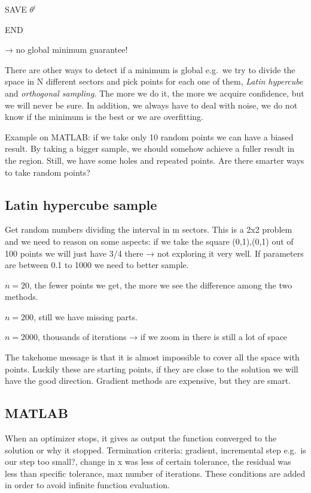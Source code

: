 SAVE $\theta^i$

END

→ no global minimum guarantee!

There are other ways to detect if a minimum is global e.g.~we try to
divide the space in N different sectors and pick points for each one of
them, \emph{Latin hypercube} and \emph{orthogonal sampling}. The more we
do it, the more we acquire confidence, but we will never be sure. In
addition, we always have to deal with noise, we do not know if the
minimum is the best or we are overfitting.

Example on MATLAB: if we take only 10 random points we can have a biased
result. By taking a bigger sample, we should somehow achieve a fuller
result in the region. Still, we have some holes and repeated points. Are
there smarter ways to take random points?

\hypertarget{latin-hypercube-sample}{%
\subsection{Latin hypercube sample}\label{latin-hypercube-sample}}

Get random numbers dividing the interval in m sectors. This is a 2x2
problem and we need to reason on some aspects: if we take the square
(0,1),(0,1) out of 100 points we will just have 3/4 there → not
exploring it very well. If parameters are between 0.1 to 1000 we need to
better sample.

$n = 20$, the fewer points we get, the more we see the difference among
the two methods.

$n = 200$, still we have missing parts.

$n = 2000$, thousands of iterations → if we zoom in there is still a lot
of space

The takehome message is that it is almost impossible to cover all the
space with points. Luckily these are starting points, if they are close
to the solution we will have the good direction. Gradient methods are
expensive, but they are smart.

\hypertarget{matlab}{%
\subsection{MATLAB}\label{matlab}}

When an optimizer stops, it gives as output the function converged to
the solution or why it stopped. Termination criteria: gradient,
incremental step e.g.~is our step too small?, change in x was less of
certain tolerance, the residual was less than specific tolerance, max
number of iterations. These conditions are added in order to avoid
infinite function evaluation.

